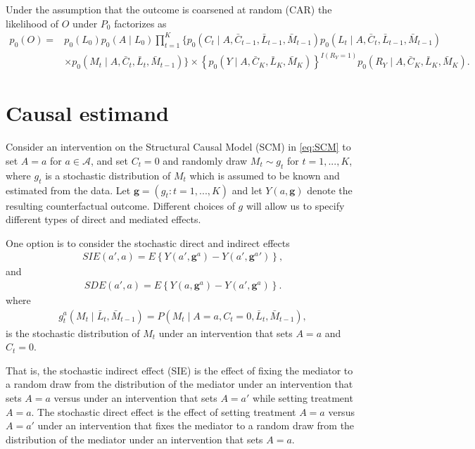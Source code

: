 \documentclass[AMA,STIX1COL]{WileyNJD-v2}
\begin{document}
Under the assumption that the outcome is coarsened at random (CAR) the likelihood of $O$ under $P_0$ factorizes as
\begin{align*}
    p_0(O)=&p_0(L_0)p_0(A \mid L_0) \prod_{t=1}^K \Big\{p_0(C_t \mid A,  \bar{C}_{t-1},\bar{L}_{t-1}, \bar{ M}_{t-1})  p_0(L_t \mid A, \bar{C}_t, \bar{L}_{t-1},  \bar{M}_{t-1}) \\
     &\times p_0(M_t \mid A, \bar{C}_t, \bar{L}_t, \bar{M}_{t-1}) \Big\} 
    \times\left\{ p_0(Y \mid A, \bar{C}_K, \bar{L}_K,  \bar{M}_K)\right\}^{I(R_Y=1)}p_0(R_Y \mid A,\bar{C}_K, \bar{L}_K, \bar{M}_K).
\end{align*}



\section{Causal estimand}\label{sec3}
Consider an intervention on the Structural Causal Model (SCM) in \eqref{eq:SCM} to set $A=a$ for $a \in \mathcal{A}$, and set $C_t=0$ and randomly draw $M_{t} \sim g_t$ for $t=1,...,K$, where $g_t$ is a stochastic distribution of $M_t$ which is assumed to be known and estimated from the data. Let $\mathbf{g}=(g_t:t=1,...,K)$ and let $Y(a, \mathbf{g})$ denote the resulting counterfactual outcome. Different choices of $g$ will allow us to specify different types of direct and mediated effects. 

One option is to consider the stochastic direct and indirect effects
\begin{align}
\label{eq:SIE}
    SIE(a', a)= E \left\{Y(a',  \mathbf{g}^{a})- Y(a',  \mathbf{g}^{a}')\right\},
\end{align}
and
\begin{align}
\label{eq:SDE}
    SDE(a', a)=E \left\{Y(a, \mathbf{g}^{a})- Y(a', \mathbf{g}^{a})\right\}.
\end{align}
where 
\begin{align*}
    g_t^{a}(M_t \mid \bar{L}_t, \bar{M}_{t-1}) = P(M_t \mid A=a, C_t=0, \bar{L}_t, \bar{M}_{t-1}),
\end{align*}
is the stochastic distribution of $M_t$ under an intervention that sets $A=a$ and $C_t=0$.

That is, the stochastic indirect effect (SIE) is the effect of fixing the mediator to a random draw from the distribution of the mediator under an intervention that sets $A=a$ versus  under an intervention that sets $A=a'$ while setting treatment $A=a$. 
The stochastic direct effect is the effect of setting treatment $A=a$ versus $A=a'$ under an intervention that fixes the mediator to a random draw from the distribution of the mediator under an intervention that sets $A=a$. 
\end{document}
